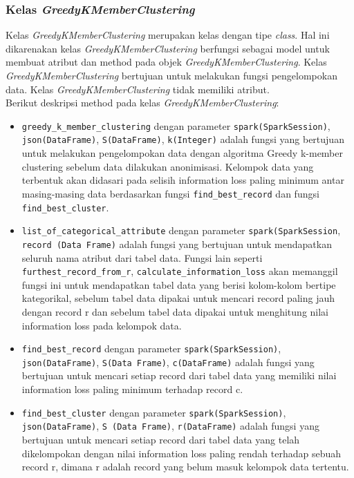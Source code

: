 \subsubsection{Kelas \textit{GreedyKMemberClustering}}
Kelas \textit{GreedyKMemberClustering} merupakan kelas dengan tipe \textit{class}. Hal ini dikarenakan kelas \textit{GreedyKMemberClustering} berfungsi sebagai model untuk membuat atribut dan method pada objek \textit{GreedyKMemberClustering}. Kelas \textit{GreedyKMemberClustering} bertujuan untuk melakukan fungsi pengelompokan data. Kelas \textit{GreedyKMemberClustering} tidak memiliki atribut.\\

\noindent Berikut deskripsi method pada kelas \textit{GreedyKMemberClustering}:

\begin{itemize}

\item \texttt{greedy\_k\_member\_clustering} dengan parameter \texttt{spark(SparkSession)}, \texttt{json(DataFrame)}, \texttt{S(DataFrame)}, \texttt{k(Integer)} adalah fungsi yang bertujuan untuk melakukan pengelompokan data dengan algoritma Greedy k-member clustering sebelum data dilakukan anonimisasi. Kelompok data yang terbentuk akan didasari pada selisih information loss paling minimum antar masing-masing data berdasarkan fungsi \texttt{find\_best\_record} dan fungsi \texttt{find\_best\_cluster}.

\item \texttt{list\_of\_categorical\_attribute} dengan parameter \texttt{spark(SparkSession}, \texttt{record (Data Frame)} adalah fungsi yang bertujuan untuk mendapatkan seluruh nama atribut dari tabel data. Fungsi lain seperti \texttt{furthest\_record\_from\_r}, \texttt{calculate\_information\_loss} akan memanggil fungsi ini untuk mendapatkan tabel data yang berisi kolom-kolom bertipe kategorikal, sebelum tabel data dipakai untuk mencari record paling jauh dengan record r dan sebelum tabel data dipakai untuk menghitung nilai information loss pada kelompok data.

\item \texttt{find\_best\_record} dengan parameter \texttt{spark(SparkSession)}, \texttt{json(DataFrame)}, \texttt{S(Data Frame)}, \texttt{c(DataFrame)} adalah fungsi yang bertujuan untuk mencari setiap record dari tabel data yang memiliki nilai information loss paling minimum terhadap record c.

\item \texttt{find\_best\_cluster} dengan parameter \texttt{spark(SparkSession)}, \texttt{json(DataFrame)}, \texttt{S (Data Frame)}, \texttt{r(DataFrame)} adalah fungsi yang bertujuan untuk mencari setiap record dari tabel data yang telah dikelompokan dengan nilai information loss paling rendah terhadap sebuah record r, dimana r adalah record yang belum masuk kelompok data tertentu.


\end{itemize}

